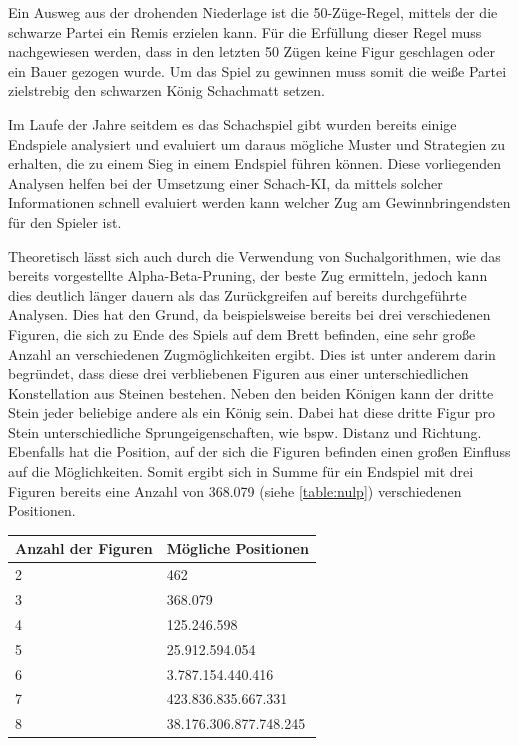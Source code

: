 Ein Ausweg aus der drohenden Niederlage ist die 50-Züge-Regel, mittels der die schwarze Partei ein Remis erzielen kann. Für die Erfüllung dieser Regel muss nachgewiesen werden, dass in den letzten 50 Zügen keine Figur geschlagen oder ein Bauer gezogen wurde.\cite{Alt2018} Um das Spiel zu gewinnen muss somit die weiße Partei zielstrebig den schwarzen König Schachmatt setzen.


Im Laufe der Jahre seitdem es das Schachspiel gibt wurden bereits einige Endspiele analysiert und evaluiert um daraus mögliche Muster und Strategien zu erhalten, die zu einem Sieg in einem Endspiel führen können. Diese vorliegenden Analysen helfen bei der Umsetzung einer Schach-KI, da mittels solcher Informationen schnell evaluiert werden kann welcher Zug am Gewinnbringendsten für den Spieler ist. 

Theoretisch lässt sich auch durch die Verwendung von Suchalgorithmen, wie das bereits vorgestellte Alpha-Beta-Pruning, der beste Zug ermitteln, jedoch kann dies deutlich länger dauern als das Zurückgreifen auf bereits durchgeführte Analysen. Dies hat den Grund, da beispielsweise bereits bei drei verschiedenen Figuren, die sich zu Ende des Spiels auf dem Brett befinden, eine sehr große Anzahl an verschiedenen Zugmöglichkeiten ergibt. Dies ist unter anderem darin begründet, dass diese drei verbliebenen Figuren aus einer unterschiedlichen Konstellation aus Steinen bestehen. Neben den beiden Königen kann der dritte Stein jeder beliebige andere als ein König sein. Dabei hat diese dritte Figur pro Stein unterschiedliche Sprungeigenschaften, wie bspw. Distanz und Richtung. Ebenfalls hat die Position, auf der sich die Figuren befinden einen großen Einfluss auf die Möglichkeiten. Somit ergibt sich in Summe für ein Endspiel mit drei Figuren bereits eine Anzahl von 368.079 (siehe \ref{table:nulp}) verschiedenen Positionen.

\begin{center}
\begin{tabular}{| p{5cm} | p{5cm} |}
\hline
\textbf{Anzahl der Figuren} & \textbf{Mögliche Positionen}\\ \hline
2 & 462\\ \hline
3 & 368.079\\ \hline
4 & 125.246.598\\ \hline
5 & 25.912.594.054\\ \hline
6 & 3.787.154.440.416\\ \hline
7 & 423.836.835.667.331\\ \hline
8 & 38.176.306.877.748.245 \cite{Kryukov2014}\\
\hline
\end{tabular}
\label{table:nulp}
\end{center}

